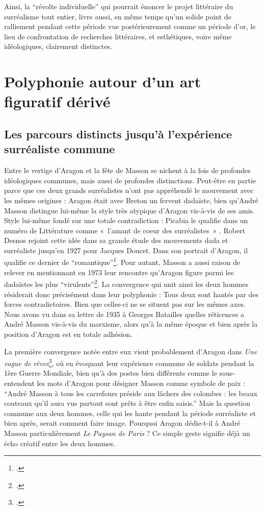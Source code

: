	Ainsi, la \enquote{révolte individuelle} qui pourrait énoncer le projet littéraire du surréalisme tout entier, livre aussi, en même temps qu’un solide point de ralliement pendant cette période vue postérieurement comme un période d’or, le lieu de confrontation de recherches littéraires, et esthétiques, voire même idéologiques, clairement distinctes. 

\section{Polyphonie autour d'un art figuratif dérivé}

\subsection{Les parcours distincts jusqu'à l'expérience surréaliste commune}


Entre le vertige d’Aragon et la fête de Masson se nichent à la fois de profondes idéologiques communes, mais aussi de profondes distinctions. Peut-être en partie parce que ces deux grands surréalistes n’ont pas appréhendé le mouvement avec les mêmes origines : Aragon était avec Breton un fervent dadaïste, bien qu’André Masson distingue lui-même la style très atypique d’Aragon vis-à-vis de ses amis. Style lui-même fondé sur une totale contradiction : Picabia le qualifie dans un numéro de Littérature comme « l’amant de coeur des surréalistes » . Robert Desnos rejoint cette idée dans sa grande étude des mouvements dada et surréaliste jusqu’en 1927 pour Jacques Doucet. Dans son portrait d’Aragon, il qualifie ce dernier de \enquote{romantique}\footcite{desnos}. Pour autant, Masson a aussi raison de relever en mentionnant en 1973 leur rencontre qu’Aragon figure parmi les dadaïstes les plus \enquote{virulents}\footcite[p84]{rebelle}. La convergence qui unit ainsi les deux hommes résiderait donc précisément dans leur polyphonie : Tous deux sont hantés par des forces contradictoires. Bien que celles-ci ne se situent pas sur les mêmes axes. Nous avons vu dans sa lettre de 1935 à Georges Batailles quelles réticences a André Masson vis-à-vis du marxisme, alors qu’à la même époque et bien après la position d’Aragon est en totale adhésion. 

La première convergence notée entre eux vient probablement d’Aragon dans \emph{Une vague de rêves}\footcite{vaguedereves}, où en évoquant leur expérience commune de soldats pendant la 1ère Guerre Mondiale, bien qu’à des postes bien différents comme le sous-entendent les mots d’Aragon pour désigner Masson comme symbole de paix : \enquote{André Masson à tous les carrefours préside aux lâchers des colombes : les beaux couteaux qu’il aura vus partout sont prêts à être enfin saisis.} Mais la question commune aux deux hommes, celle qui les hante pendant la période surréaliste et bien après, serait comment faire image. Pourquoi Aragon dédie-t-il à André Masson particulièrement \emph{Le Paysan de Paris }? Ce simple geste signifie déjà un écho créatif entre les deux hommes.

